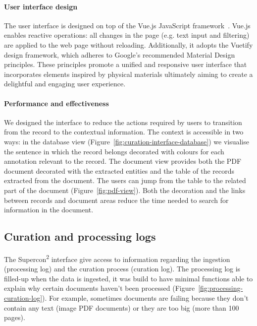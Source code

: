 \documentclass[a4paper]{article}
\begin{document}
\paragraph{User interface design}
The user interface is designed on top of the Vue.js JavaScript framework~\cite{vuejs}.  
Vue.js enables reactive operations: all changes in the page (e.g. text input and filtering) are applied to the web page without reloading. 
Additionally, it adopts the Vuetify design framework\cite{vuetify}, which adheres to Google's recommended Material Design principles.
These principles promote a unified and responsive user interface that incorporates elements inspired by physical materials ultimately aiming to create a delightful and engaging user experience.

\paragraph{Performance and effectiveness}
We designed the interface to reduce the actions required by users to transition from the record to the contextual information. 
The context is accessible in two ways: in the database view (Figure~\ref{fig:curation-interface-database}) we visualise the sentence in which the record belongs decorated with colours for each annotation relevant to the record.
The document view provides both the PDF document decorated with the extracted entities and the table of the records extracted from the document. The users can jump from the table to the related part of the document (Figure~\ref{fig:pdf-view}). 
Both the decoration and the links between records and document areas reduce the time needed to search for information in the document. 

\subsection{Curation and processing logs}
\label{subsec:curation-and-processing-logs}

The Supercon\textsuperscript{2} interface give access to information regarding the ingestion (processing log) and the curation process (curation log). 
The processing log is filled-up when the data is ingested, it was build to have minimal functions able to explain why certain documents haven't been processed (Figure~\ref{fig:processing-curation-log}). 
For example, sometimes documents are failing because they don't contain any text (image PDF documents) or they are too big (more than 100 pages). 
\end{document}
